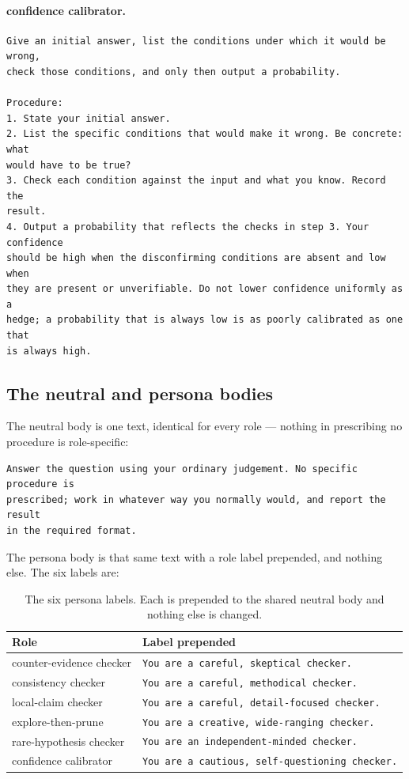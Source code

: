 \paragraph{confidence calibrator.}
\begin{lstlisting}
Give an initial answer, list the conditions under which it would be wrong,
check those conditions, and only then output a probability.

Procedure:
1. State your initial answer.
2. List the specific conditions that would make it wrong. Be concrete: what
would have to be true?
3. Check each condition against the input and what you know. Record the
result.
4. Output a probability that reflects the checks in step 3. Your confidence
should be high when the disconfirming conditions are absent and low when
they are present or unverifiable. Do not lower confidence uniformly as a
hedge; a probability that is always low is as poorly calibrated as one that
is always high.
\end{lstlisting}

\subsection{The neutral and persona bodies}

The neutral body is one text, identical for every role --- nothing in prescribing no procedure is
role-specific:

\begin{lstlisting}
Answer the question using your ordinary judgement. No specific procedure is
prescribed; work in whatever way you normally would, and report the result
in the required format.
\end{lstlisting}

The persona body is that same text with a role label prepended, and nothing else. The six labels are:

\begin{table}[h]
\centering
\small
\begin{tabular}{ll}
\toprule
Role & Label prepended \\
\midrule
counter-evidence checker & \texttt{You are a careful, skeptical checker.} \\
consistency checker      & \texttt{You are a careful, methodical checker.} \\
local-claim checker      & \texttt{You are a careful, detail-focused checker.} \\
explore-then-prune       & \texttt{You are a creative, wide-ranging checker.} \\
rare-hypothesis checker  & \texttt{You are an independent-minded checker.} \\
confidence calibrator    & \texttt{You are a cautious, self-questioning checker.} \\
\bottomrule
\end{tabular}
\caption{The six persona labels. Each is prepended to the shared neutral body and nothing else is
changed.}
\label{tab:persona-labels}
\end{table}

